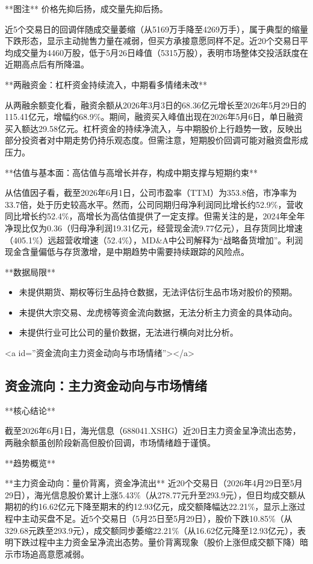 \documentclass[12pt,a4paper]{article}
\begin{document}
**图注** 价格先抑后扬，成交量先抑后扬。

近5个交易日的回调伴随成交量萎缩（从5169万手降至4269万手），属于典型的缩量下跌形态，显示主动抛售力量在减弱，但买方承接意愿同样不足。近20个交易日平均成交量为4460万股，低于5月26日峰值（5315万股），表明市场整体交投活跃度在近期高点后有所降温。

**两融资金：杠杆资金持续流入，中期看多情绪未改**

从两融余额变化看，融资余额从2026年3月3日的68.36亿元增长至2026年5月29日的115.41亿元，增幅约68.9\%。期间，融资买入峰值出现在2026年5月6日，单日融资买入额达29.58亿元。杠杆资金的持续净流入，与中期股价上行趋势一致，反映出部分投资者对中期走势仍持乐观态度。但需注意，短期股价回调可能对融资盘形成压力。

**估值与基本面：高估值与高增长并存，构成中期支撑与短期约束**

从估值因子看，截至2026年6月1日，公司市盈率（TTM）为353.8倍，市净率为33.7倍，处于历史较高水平。然而，公司同期归母净利润同比增长约52.9\%，营收同比增长约52.4\%，高增长为高估值提供了一定支撑。但需关注的是，2024年全年净现比仅为0.36（归母净利润19.31亿元，经营现金流9.77亿元），且存货同比增速（405.1\%）远超营收增速（52.4\%），MD\&A中公司解释为“战略备货增加”。利润现金含量偏低与存货激增，是中期趋势中需要持续跟踪的风险点。

**数据局限**
\begin{itemize}
\item 未提供期货、期权等衍生品持仓数据，无法评估衍生品市场对股价的预期。
\item 未提供大宗交易、龙虎榜等资金流向数据，无法分析主力资金的具体动向。
\item 未提供行业可比公司的量价数据，无法进行横向对比分析。
\end{itemize}

<a id=''资金流向主力资金动向与市场情绪''></a>

\subsection{ 资金流向：主力资金动向与市场情绪}

**核心结论**

截至2026年6月1日，海光信息（688041.XSHG）近20日主力资金呈净流出态势，两融余额虽创阶段新高但股价回调，市场情绪趋于谨慎。

**趋势概览**

**主力资金动向：量价背离，资金净流出**
近20个交易日（2026年4月29日至5月29日），海光信息股价累计上涨5.43\%（从278.77元升至293.9元），但日均成交额从期初的约16.62亿元下降至期末的约12.93亿元，成交额降幅达22.21\%，显示上涨过程中主动买盘不足。近5个交易日（5月25日至5月29日），股价下跌10.85\%（从329.68元跌至293.9元），成交额同步萎缩22.21\%（从16.62亿元降至12.93亿元），表明下跌过程中主力资金呈净流出态势。量价背离现象（股价上涨但成交额下降）暗示市场追高意愿减弱。
\end{document}
